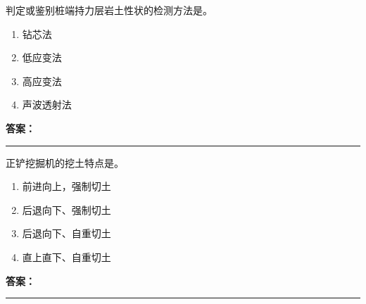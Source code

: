 \documentclass[UTF8,fontset=fandol,11pt]{ctexart}
\newcommand{\answerline}{\textcolor{answerred}{\rule{2.4cm}{0.7pt}}}
\begin{document}
\vspace{0.2em}

\begin{quizbox}[title={乱序第 119 题｜第二章桩基础工程}]

判定或鉴别桩端持力层岩土性状的检测方法是。\\

\begin{enumerate}[label=\Alph*.]

\item 钻芯法

\item 低应变法

\item 高应变法

\item 声波透射法

\end{enumerate}

\textbf{\textcolor{answerred}{答案：}} \answerline

\end{quizbox}

\vspace{0.2em}

\begin{quizbox}[title={乱序第 120 题｜第一章土方工程}]

正铲挖掘机的挖土特点是。\\

\begin{enumerate}[label=\Alph*.]

\item 前进向上，强制切土

\item 后退向下、强制切土

\item 后退向下、自重切土

\item 直上直下、自重切土

\end{enumerate}

\textbf{\textcolor{answerred}{答案：}} \answerline

\end{quizbox}

\vspace{0.2em}
\end{document}
